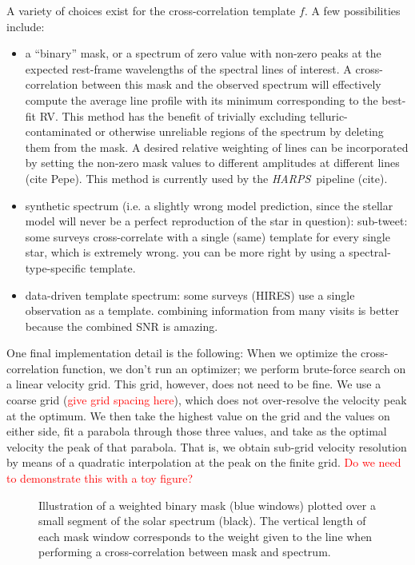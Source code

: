 \documentclass[modern]{aastex62}
\newcommand{\todo}[1]{\textcolor{red}{#1}}  %
\newcommand{\acronym}[1]{{\small{#1}}}
\newcommand{\project}[1]{\textsl{#1}}
\newcommand{\HARPS}{\project{\acronym{HARPS}}}
\begin{document}
A variety of choices exist for the cross-correlation template $f$. A few possibilities include:
\begin{itemize}
\item a ``binary'' mask, or a spectrum of zero value with non-zero peaks at the expected rest-frame wavelengths of the spectral lines of interest. A cross-correlation between this mask and the observed spectrum will effectively compute the average line profile with its minimum corresponding to the best-fit RV. This method has the benefit of trivially excluding telluric-contaminated or otherwise unreliable regions of the spectrum by deleting them from the mask. A desired relative weighting of lines can be incorporated by setting the non-zero mask values to different amplitudes at different lines (cite Pepe). This method is currently used by the \HARPS\ pipeline (cite).
\item synthetic spectrum (i.e. a slightly wrong model prediction, since the stellar model will never be a perfect reproduction of the star in question): sub-tweet: some surveys cross-correlate with a single (same) template for every single star, which is extremely wrong. you can be more right by using a spectral-type-specific template.
\item data-driven template spectrum: some surveys (HIRES) use a single observation as a template. combining information from many visits is better because the combined SNR is amazing.
\end{itemize}

One final implementation detail is the following:
When we optimize the cross-correlation function, we don't run an optimizer;
we perform brute-force search on a linear velocity grid.
This grid, however, does not need to be fine.
We use a coarse grid (\todo{give grid spacing here}), which does not
over-resolve the velocity peak at the optimum.
We then take the highest value on the grid and the values on either
side, fit a parabola through those three values, and take as the optimal
velocity the peak of that parabola.
That is, we obtain sub-grid velocity resolution by means of a quadratic
interpolation at the peak on the finite grid.
\todo{Do we need to demonstrate this with a toy figure?}

\begin{figure}
\centering
\caption{Illustration of a weighted binary mask (blue windows) plotted over a small segment of the solar spectrum (black). The vertical length of each mask window corresponds to the weight given to the line when performing a cross-correlation between mask and spectrum.}
\label{fig:binarymask}
\end{figure}
\end{document}
